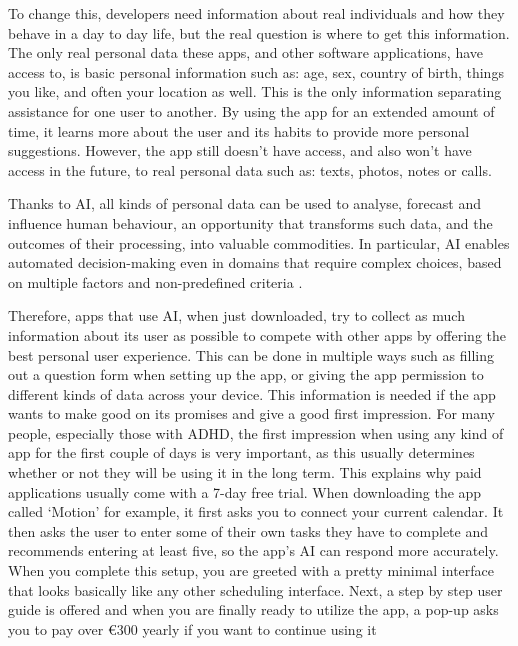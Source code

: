 \documentclass[english]{hogent-article}
\begin{document}
To change this, developers need information about real individuals and how they behave in a day to day life, but the real question is where to get this information. 
The only real personal data these apps, and other software applications, have access to, is basic personal information such as: age, sex, country of birth, things you like, and often your location as well. This is the only information separating assistance for one user to another. By using the app for an extended amount of time, it learns more about the user and its habits to provide more personal suggestions. However, the app still doesn't have access, and also won’t have access in the future,  to real personal data such as: texts, photos, notes or calls.

Thanks to AI, all kinds of personal data can be used to analyse, forecast and influence human behaviour, an opportunity that transforms such data, and the outcomes of their processing, into valuable commodities. In particular, AI enables automated decision-making even in domains that require complex choices, based on multiple factors and non-predefined criteria \autocite{Sartor2020}.

Therefore, apps that use AI, when just downloaded, try to collect as much information about its user as possible to compete with other apps by offering the best personal user experience. This can be done in multiple ways such as filling out a question form when setting up the app, or giving the app permission to different kinds of data across your device. This information is needed if the app wants to make good on its promises and give a good first impression. For many people, especially those with ADHD, the first impression when using any kind of app for the first couple of days is very important, as this usually determines whether or not they will be using it in the long term. This explains why paid applications usually come with a 7-day free trial. When downloading the app called ‘Motion’ for example, it first asks you to connect your current calendar. It then asks the user to enter some of their own tasks they have to complete and recommends entering at least five, so the app’s AI can respond more accurately. When you complete this setup, you are greeted with a pretty minimal interface that looks basically like any other scheduling interface. Next, a step by step user guide is offered and when you are finally ready to utilize the app, a pop-up asks you to pay over €300 yearly if you want to continue using it
\end{document}
